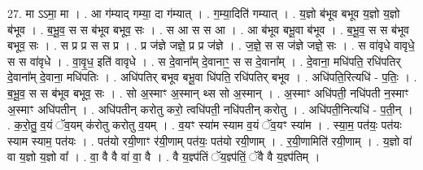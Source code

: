 \documentclass[17pt]{extarticle}
\begin{document}
27. मा ऽऽमा॒ मा । . आ ग॑म्याद् गम्या॒ दा ग॑म्यात् । . ग॒म्या॒दिति॑ गम्यात् । . य॒ज्ञो ब॑भूव बभूव य॒ज्ञो य॒ज्ञो ब॑भूव । . ब॒भू॒व॒ स स ब॑भूव बभूव॒ सः । . स आ स स आ । . आ ब॑भूव बभू॒वा ब॑भूव । . ब॒भू॒व॒ स स ब॑भूव बभूव॒ सः । . स प्र प्र स स प्र । . प्र ज॑ज्ञे जज्ञे॒ प्र प्र ज॑ज्ञे । . ज॒ज्ञे॒ स स ज॑ज्ञे जज्ञे॒ सः । . स वा॑वृधे वावृधे॒ स स वा॑वृधे । . वा॒वृ॒ध॒ इति॑ वावृधे । . स दे॒वाना᳚म् दे॒वानाꣳ॒॒ स स दे॒वाना᳚म् । . दे॒वाना॒ मधि॑पति॒ रधि॑पतिर् दे॒वाना᳚म् दे॒वाना॒ मधि॑पतिः । . अधि॑पतिर् बभूव बभू॒वा धि॑पति॒ रधि॑पतिर् बभूव । . अधि॑पति॒रित्यधि॑ - प॒तिः॒ । . ब॒भू॒व॒ स स ब॑भूव बभूव॒ सः । . सो अ॒स्माꣳ अ॒स्मान् थ्स सो अ॒स्मान् । . अ॒स्माꣳ अधि॑पती॒ नधि॑पती न॒स्माꣳ अ॒स्माꣳ अधि॑पतीन् । . अधि॑पतीन् करोतु करो॒ त्वधि॑पती॒ नधि॑पतीन् करोतु । . अधि॑पती॒नित्यधि॑ - प॒ती॒न् । . क॒रो॒तु॒ व॒यं ॅव॒यम् क॑रोतु करोतु व॒यम् । . व॒यꣳ स्या॑म स्याम व॒यं ॅव॒यꣳ स्या॑म । . स्या॒म॒ पत॑यः॒ पत॑यः स्याम स्याम॒ पत॑यः । . पत॑यो रयी॒णाꣳ र॑यी॒णाम् पत॑यः॒ पत॑यो रयी॒णाम् । . र॒यी॒णामिति॑ रयी॒णाम् । . य॒ज्ञो वा॑ वा य॒ज्ञो य॒ज्ञो वा᳚ । . वा॒ वै वै वा॑ वा॒ वै । . वै य॒ज्ञ्प॑तिं ॅय॒ज्ञ्प॑तिं॒ ॅवै वै य॒ज्ञ्प॑तिम् । \newline
\end{document}
